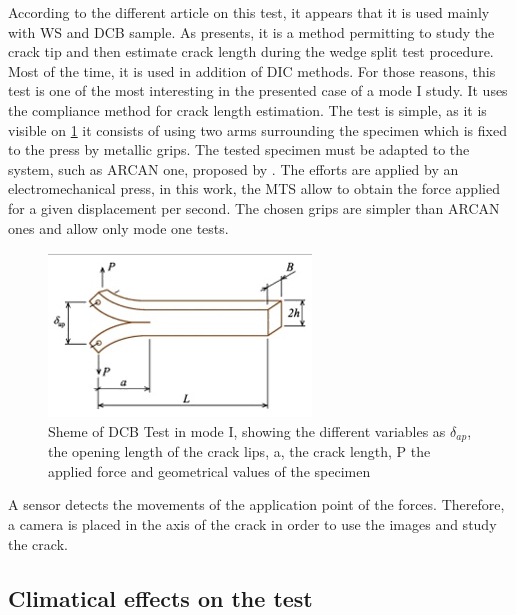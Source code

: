 According to the different article on this test, it appears that it is used mainly with WS and DCB sample. As \parencite{Reference11} presents, it is a method permitting to study the crack tip and then estimate crack length during the wedge split test procedure. Most of the time, it is used in addition of DIC methods. For those reasons, this test is one of the most interesting in the presented case of a mode I study. It uses the compliance method for crack length estimation. 
The test is simple, as it is visible on \ref{fig:Fig6} it consists of using two arms surrounding the specimen which is fixed to the press by metallic grips. The tested specimen must be adapted to the system, such as ARCAN one, proposed by \parencite{Reference6}. The efforts are applied by an electromechanical press, in this work, the MTS allow to obtain the force applied for a given displacement per second. The chosen grips are simpler than ARCAN ones and allow only mode one tests.
\begin{figure}[th]
	\centering
	\includegraphics{Figures/DCB Test}
	\decoRule
	\caption[DCB Test]{Sheme of DCB Test in mode I, showing the different variables as $\delta_{ap}$, the opening length of the crack lips, a, the crack length, P the applied force and geometrical values of the specimen}
	\label{fig:Fig6}
\end{figure}
A sensor detects the movements of the application point of the forces.
Therefore, a camera is placed in the axis of the crack in order to use the images and study the crack.



\subsection{Climatical effects on the test}


